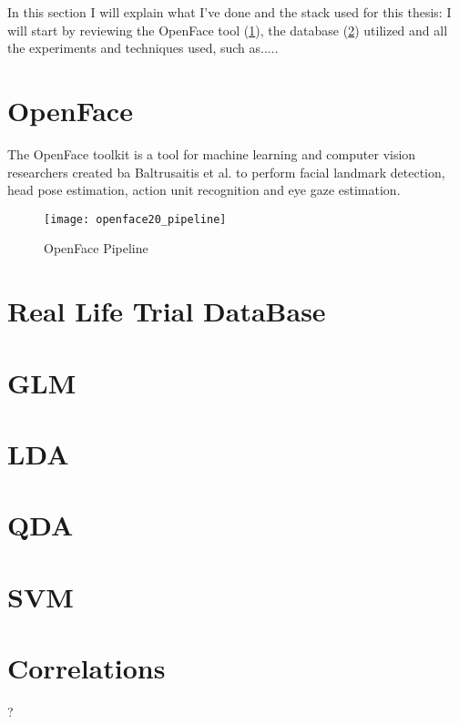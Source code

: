 In this section I will explain what I've done and the stack used for this thesis: I will start by reviewing the OpenFace tool (\ref{OpenFace}), the database (\ref{rldb}) utilized and all the experiments and techniques used, such as.....


\section{OpenFace} \label{OpenFace}
The OpenFace \cite{Baltru2018} toolkit is a tool for machine learning and computer vision researchers created ba Baltrusaitis et al. to perform facial landmark detection, head pose estimation, action unit recognition and eye gaze estimation. \\

\begin{figure}[H]
	\centering
	\texttt{[image: openface20\_pipeline]}
	\caption{OpenFace Pipeline \cite{Baltru2018}}
	\label{fig:openface20_pipeline}
\end{figure}


\section{Real Life Trial DataBase} \label{rldb}

\section{GLM}

\section{LDA}

\section{QDA}

\section{SVM}

\section{Correlations} ?